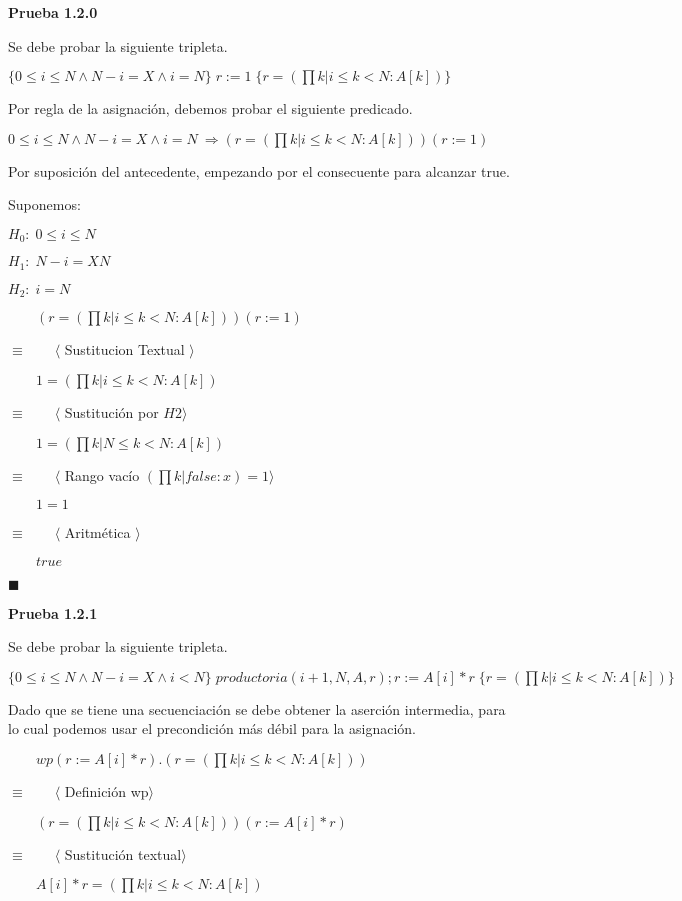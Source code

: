 \documentclass[hidelinks]{article}
\begin{document}
\begin{itemize}
	      \textbf{Prueba 1.2.0}\par
	      Se debe probar la siguiente tripleta.\par
	      $\{0 \leq i \leq N \land N - i = X \land i = N\} \; r := 1 \; \{r = (\prod k | i \leq k < N: A[k])\} $\par
	      Por regla de la asignación, debemos probar el siguiente predicado.\par
	      $0 \leq i \leq N \land N - i = X \land i = N\ \Rightarrow (r = (\prod k | i \leq k < N: A[k]))(r := 1) $\par
	      Por suposición del antecedente, empezando por el consecuente para alcanzar
	      true.\par
	      Suponemos:\par
	      $H_0: \; 0 \leq i \leq N$\par
	      $H_1: \; N - i = X N$\par
	      $H_2: \; i = N$\par
	      $\qquad (r = (\prod k | i \leq k < N: A[k]))(r := 1)$\par
	      $\equiv \qquad \langle$ Sustitucion Textual $\rangle$\par
	      $\qquad 1 = (\prod k | i \leq k < N: A[k])$\par
	      $\equiv \qquad \langle$ Sustitución por $H2\rangle$\par
	      $\qquad 1 = (\prod k | N \leq k < N: A[k])$\par
	      $\equiv \qquad \langle$ Rango vacío $(\prod k | false: x) = 1\rangle$\par
	      $\qquad 1 = 1$\par
	      $\equiv \qquad \langle$ Aritmética $\rangle$\par
	      $\qquad true$\par
	      $\blacksquare$\par

	      \textbf{Prueba 1.2.1}\par
	      Se debe probar la siguiente tripleta.\par
	      $\{0 \leq i \leq N \land N - i = X \land i < N\} \; productoria(i + 1, N, A, r);r := A[i] * r \; \{r = (\prod k | i \leq k < N: A[k])\} $\par
	      Dado que se tiene una secuenciación se debe obtener la aserción intermedia,
	      para lo cual podemos usar el precondición más débil para la asignación.\par
	      $\qquad wp(r := A[i]*r).(r = (\prod k | i \leq k < N: A[k]))$\par
	      $\equiv \qquad \langle$ Definición wp$\rangle$\par
	      $\qquad (r = (\prod k | i \leq k < N: A[k]))(r := A[i]*r)$\par
	      $\equiv \qquad \langle$ Sustitución textual$\rangle$\par
	      $\qquad A[i]*r = (\prod k | i \leq k < N: A[k])$\par


\end{itemize}
\end{document}
